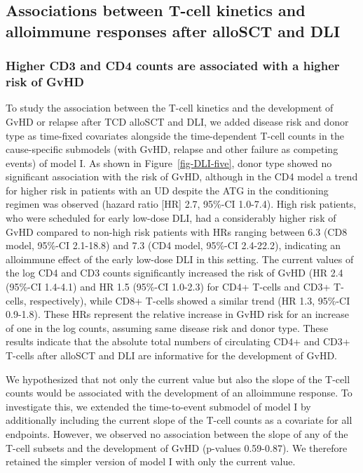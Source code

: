 \documentclass[
  letterpaper,
  DIV=11,
  numbers=noendperiod]{scrreprt}
\begin{document}
\subsection{Associations between T-cell kinetics and alloimmune
responses after alloSCT and
DLI}\label{associations-between-t-cell-kinetics-and-alloimmune-responses-after-allosct-and-dli}

\subsubsection{Higher CD3 and CD4 counts are associated with a higher
risk of
GvHD}\label{higher-cd3-and-cd4-counts-are-associated-with-a-higher-risk-of-gvhd}

To study the association between the T-cell kinetics and the development
of GvHD or relapse after TCD alloSCT and DLI, we added disease risk and
donor type as time-fixed covariates alongside the time-dependent T-cell
counts in the cause-specific submodels (with GvHD, relapse and other
failure as competing events) of model I. As shown in
Figure~\ref{fig-DLI-five}, donor type showed no significant association
with the risk of GvHD, although in the CD4 model a trend for higher risk
in patients with an UD despite the ATG in the conditioning regimen was
observed (hazard ratio {[}HR{]} 2.7, 95\%-CI 1.0-7.4). High risk
patients, who were scheduled for early low-dose DLI, had a considerably
higher risk of GvHD compared to non-high risk patients with HRs ranging
between 6.3 (CD8 model, 95\%-CI 2.1-18.8) and 7.3 (CD4 model, 95\%-CI
2.4-22.2), indicating an alloimmune effect of the early low-dose DLI in
this setting. The current values of the log CD4 and CD3 counts
significantly increased the risk of GvHD (HR 2.4 (95\%-CI 1.4-4.1) and
HR 1.5 (95\%-CI 1.0-2.3) for CD4+ T-cells and CD3+ T-cells,
respectively), while CD8+ T-cells showed a similar trend (HR 1.3,
95\%-CI 0.9-1.8). These HRs represent the relative increase in GvHD risk
for an increase of one in the log counts, assuming same disease risk and
donor type. These results indicate that the absolute total numbers of
circulating CD4+ and CD3+ T-cells after alloSCT and DLI are informative
for the development of GvHD.

We hypothesized that not only the current value but also the slope of
the T-cell counts would be associated with the development of an
alloimmune response. To investigate this, we extended the time-to-event
submodel of model I by additionally including the current slope of the
T-cell counts as a covariate for all endpoints. However, we observed no
association between the slope of any of the T-cell subsets and the
development of GvHD (p-values 0.59-0.87). We therefore retained the
simpler version of model I with only the current value.\\
\end{document}
